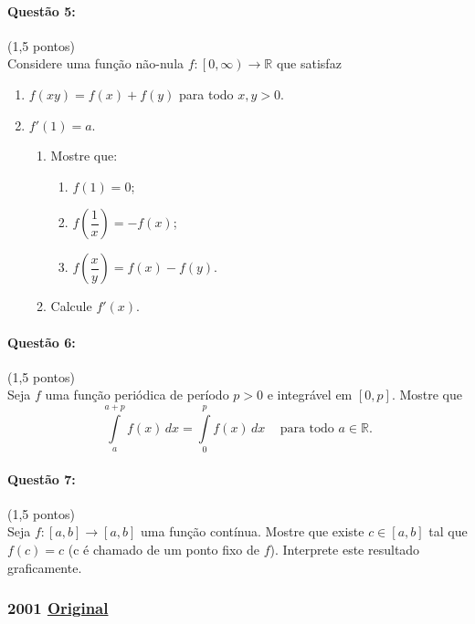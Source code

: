 \documentclass[12pt,a4paper]{article}
\newcommand{\original}[1]{\tiny \href{#1}{Original} \normalsize}
\begin{document}
\paragraph{Questão 5:}(1,5 pontos)\\
Considere uma função não-nula $f:\left [  0,\infty  \right )  \to \mathbb{R}$ que satisfaz
\begin{enumerate}
\item $f(xy)=f(x)+f(y)$ para todo $x,y>0$.
\item $f'(1)=a$.

\begin{enumerate}
\item Mostre que:
\begin{enumerate}
\item $f(1)=0$;
\item $f\left ( \dfrac{1}{x} \right )=-f(x)$;
\item $f\left ( \dfrac{x}{y} \right )=f(x)-f(y)$. 

\end{enumerate}

\item Calcule $f'(x)$.

\end{enumerate}
\end{enumerate}

\paragraph{Questão 6:}(1,5 pontos)\\
Seja $f$ uma função periódica de período $p>0$ e integrável em $\left [ 0,p \right ]$. Mostre que
$$\int\limits_{a}^{a+p}f(x)\,dx=\int\limits_{0}^{p}f(x)\,dx\;\;\; \text{ para todo }a \in \mathbb{R}.$$

\paragraph{Questão 7:}(1,5 pontos)\\
Seja $f:\left [ a,b \right ] \to \left [ a,b \right ]$ uma função contínua. Mostre que existe $c \in \left [ a,b \right ]$ tal que $f(c)=c$ (c é chamado de um ponto fixo de $f$). Interprete este resultado graficamente.

\newpage
\subsubsection{2001 \original{https://drive.google.com/open?id=18VeC0cOijh8UPlM8ONahJHsSAem3YCcs}}
\end{document}
